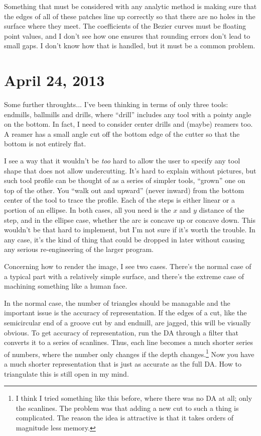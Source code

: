 \documentclass[titlepage,oneside,10pt]{article}
\begin{document}
Something that must be considered with any analytic method is making
sure that the edges of all of these patches line up correctly so that
there are no holes in the surface where they meet. The coefficients of
the Bezier curves must be floating point values, and I don't see how
one ensures that rounding errors don't lead to small gaps. I don't
know how that is handled, but it must be a common problem.

\section{April 24, 2013}

Some further throughts... I've been thinking in terms of only three
tools: endmills, ballmills and drills, where ``drill'' includes any
tool with a pointy angle on the bottom. In fact, I need to consider
center drills and (maybe) reamers too. A reamer has a small angle cut
off the bottom edge of the cutter so that the bottom is not entirely
flat. 

I see a way that it wouldn't be \emph{too} hard to allow the user to
specify any tool shape that does not allow undercutting. It's hard to
explain without pictures, but such tool profile can be thought of as a
series of simpler tools, ``grown'' one on top of the other. You ``walk
out and upward'' (never inward) from the bottom center of the tool to
trace the profile. Each of the steps is either linear or a portion of
an ellipse. In both cases, all you need is the $x$ and $y$ distance of
the step, and in the ellipse case, whether the arc is concave up or
concave down. This wouldn't be that hard to implement, but I'm not
sure if it's worth the trouble. In any case, it's the kind of thing
that could be dropped in later without causing any serious
re-engineering of the larger program.

Concerning how to render the image, I see two cases. There's the
normal case of a typical part with a relatively simple surface, and
there's the extreme case of machining something like a human face.

In the normal case, the number of triangles should be managable and
the important issue is the accuracy of representation. If the edges of
a cut, like the semicircular end of a groove cut by and endmill, are
jagged, this will be visually obvious. To get accuracy of
representation, run the DA through a filter that converts it to a
series of scanlines. Thus, each line becomes a much shorter series of
numbers, where the number only changes if the depth changes.\footnote{I think I
tried something like this before, where there was no DA at all; only
the scanlines. The problem was that adding a new cut to such a thing
is complicated. The reason the idea is attractive is that it takes
orders of magnitude less memory.} Now you have a much shorter
representation that is just as accurate as the full DA. How to
triangulate this is still open in my mind.
\end{document}
